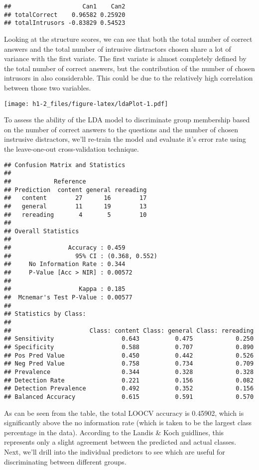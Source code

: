 \documentclass[12pt,]{article}
\begin{document}
\begin{verbatim}
##                    Can1    Can2
## totalCorrect    0.96582 0.25920
## totalIntrusors -0.83829 0.54523
\end{verbatim}

Looking at the structure scores, we can see that both the total number
of correct answers and the total number of intrusive distractors chosen
share a lot of variance with the first variate. The first variate is
almost completely defined by the total number of correct answers, but
the contribution of the number of chosen intrusors in also considerable.
This could be due to the relatively high correlation between those two
variables.

\texttt{[image: h1-2\_files/figure-latex/ldaPlot-1.pdf]}

To assess the ability of the LDA model to discriminate group membership
based on the number of correct answers to the questions and the number
of chosen instrusive distractors, we'll re-train the model and evaluate
it's error rate using the leave-one-out cross-validation technique.

\begin{verbatim}
## Confusion Matrix and Statistics
## 
##            Reference
## Prediction  content general rereading
##   content        27      16        17
##   general        11      19        13
##   rereading       4       5        10
## 
## Overall Statistics
##                                         
##                Accuracy : 0.459         
##                  95% CI : (0.368, 0.552)
##     No Information Rate : 0.344         
##     P-Value [Acc > NIR] : 0.00572       
##                                         
##                   Kappa : 0.185         
##  Mcnemar's Test P-Value : 0.00577       
## 
## Statistics by Class:
## 
##                      Class: content Class: general Class: rereading
## Sensitivity                   0.643          0.475            0.250
## Specificity                   0.588          0.707            0.890
## Pos Pred Value                0.450          0.442            0.526
## Neg Pred Value                0.758          0.734            0.709
## Prevalence                    0.344          0.328            0.328
## Detection Rate                0.221          0.156            0.082
## Detection Prevalence          0.492          0.352            0.156
## Balanced Accuracy             0.615          0.591            0.570
\end{verbatim}

As can be seen from the table, the total LOOCV accuracy is 0.45902,
which is significantly above the no information rate (which is taken to
be the largest class percentage in the data). According to the Landis \&
Koch \citep[1977; as reported in][]{salkind_encyclopedia_2007}
guidlines, this represents only a slight agreement between the predicted
and actual classes. Next, we'll drill into the individual predictors to
see which are useful for discriminating between different groups.
\end{document}
